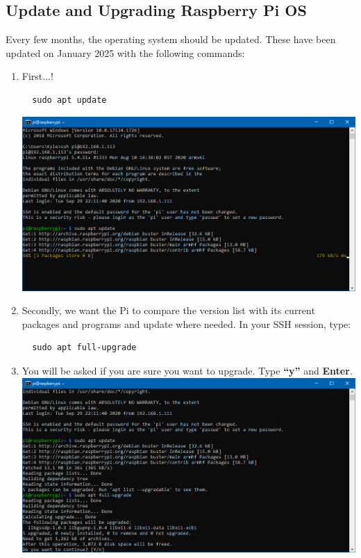\documentclass{article}
\begin{document}
\subsection{Update and Upgrading Raspberry Pi OS} 
\label{updateupgrade}

Every few months, the operating system should be updated. These have been updated on January 2025 with the following commands: 
\begin{enumerate}
\item First...!
 \begin{lstlisting}
  sudo apt update
  \end{lstlisting}
  \includegraphics[width=1.00\textwidth]{aptupdate}
  \item Secondly, we want the Pi to compare the version list with its current packages and programs and update where needed. In your SSH session, type:
  \begin{lstlisting}
  sudo apt full-upgrade
  \end{lstlisting}
  \item You will be asked if you are sure you want to upgrade. Type \textbf{``y''} and \textbf{Enter}.
  \newline
  \newline
  \includegraphics[width=1.00\textwidth]{aptupgradecont}

\end{enumerate}
\end{document}
